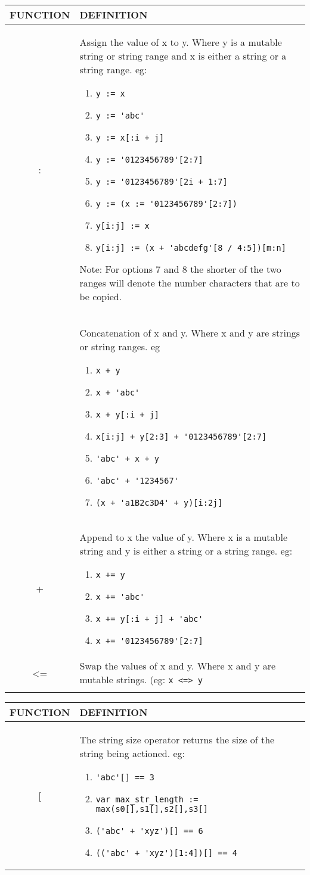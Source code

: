 \begin{tabular}{|c|p{}|}
\hline 
FUNCTION & DEFINITION\tabularnewline
\hline 
: & Assign the value of x to y. Where y is a mutable string or string
range and x is either a string or a string range. eg: 
\begin{enumerate}
\item \verb'y := x' 
\item \verb"y := 'abc'" 
\item \verb'y := x[:i + j]' 
\item \verb"y := '0123456789'[2:7]" 
\item \verb"y := '0123456789'[2i + 1:7]" 
\item \verb"y := (x := '0123456789'[2:7])" 
\item \verb"y[i:j] := x" 
\item \verb"y[i:j] := (x + 'abcdefg'[8 / 4:5])[m:n]" 
\end{enumerate}
Note: For options 7 and 8 the shorter of the two ranges will denote
the number characters that are to be copied.\tabularnewline
 & Concatenation of x and y. Where x and y are strings or string ranges.
eg 
\begin{enumerate}
\item \verb"x + y" 
\item \verb"x + 'abc'" 
\item \verb"x + y[:i + j]" 
\item \verb"x[i:j] + y[2:3] + '0123456789'[2:7]" 
\item \verb"'abc' + x + y" 
\item \verb"'abc' + '1234567'" 
\item \verb"(x + 'a1B2c3D4' + y)[i:2j]" 
\end{enumerate}
\tabularnewline
+ & Append to x the value of y. Where x is a mutable string and y is either
a string or a string range. eg: 
\begin{enumerate}
\item \verb"x += y" 
\item \verb"x += 'abc'" 
\item \verb"x += y[:i + j] + 'abc'" 
\item \verb"x += '0123456789'[2:7]" 
\end{enumerate}
\tabularnewline
\textless = & Swap the values of x and y. Where x and y are mutable strings. (eg:
\verb'x <=> y'\tabularnewline
\hline 
 & \tabularnewline
\end{tabular}

\begin{tabular}{|c|p{}|}
\hline 
FUNCTION & DEFINITION\tabularnewline
\hline 
{[} & The string size operator returns the size of the string being actioned.
eg: 
\begin{enumerate}
\item \verb"'abc'[] == 3" 
\item \verb"var max_str_length := max(s0[],s1[],s2[],s3[]" 
\item \verb"('abc' + 'xyz')[] == 6" 
\item \verb"(('abc' + 'xyz')[1:4])[] == 4" 
\end{enumerate}
\tabularnewline
\hline 
\end{tabular}

